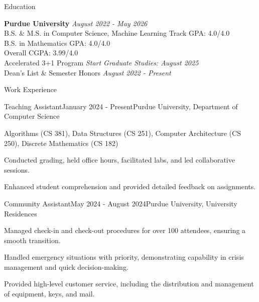 \documentclass[
    11pt, %
]{resume} %
\begin{document}

\small
\begin{rSection}{Education}

    \textbf{Purdue University} \hfill \textit{August 2022 - May 2026} \\
    B.S. \& M.S. in Computer Science, Machine Learning Track \hfill GPA: 4.0/4.0 \\
    B.S. in Mathematics \hfill GPA: 4.0/4.0 \\
    \hspace*{\fill}  Overall CGPA: 3.99/4.0 \\
    Accelerated 3+1 Program \hfill {\em Start Graduate Studies: August 2025} \\
    Dean's List \& Semester Honors \hfill {\em August 2022 - Present}

\end{rSection}



\begin{rSection}{Work Experience}
    \begin{rSubsection}{Teaching Assistant}{January 2024 - Present}{Purdue University, Department of Computer Science}{}
        \item Algorithms (CS 381), Data Structures (CS 251), Computer Architecture (CS 250), Discrete Mathematics (CS 182)
        \item Conducted grading, held office hours, facilitated labs, and led collaborative sessions.
        \item Enhanced student comprehension and provided detailed feedback on assignments.
    \end{rSubsection}
    \vspace*{0,3cm}
    
\begin{rSubsection}{Community Assistant}{May 2024 - August 2024}{Purdue University, University Residences}{}
    \item Managed check-in and check-out procedures for over 100 attendees, ensuring a smooth transition.
    \item Handled emergency situations with priority, demonstrating capability in crisis management and quick decision-making.
    \item Provided high-level customer service, including the distribution and management of equipment, keys, and mail.
\end{rSubsection}

\end{rSection}
\end{document}
